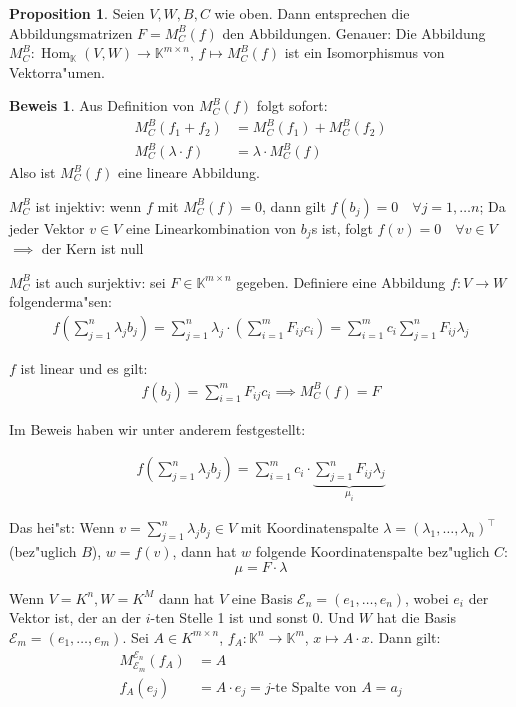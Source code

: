 \documentclass[oneside,fontsize=11pt,paper=a4,BCOR=0mm,DIV=12,automark,headsepline]{scrbook}
\DeclareMathOperator{\mHom}{Hom}
\theoremstyle{remark}
\theoremstyle{definition}
\newtheorem*{proposition}{Proposition}
\theoremstyle{definition}
\newtheorem*{prof}{Beweis}
\theoremstyle{remark}
\begin{document}
\begin{proposition} Seien \(V,W,B,C\) wie oben. Dann entsprechen die Abbildungsmatrizen
  \(F = M_C^B(f)\) den Abbildungen.  Genauer: Die Abbildung \(M_C^B: \mHom_\mathbb{K}(V,W)\to\mathbb{K}^{m\times n}\), \(f \mapsto M_C^B(f)\) ist ein Isomorphismus von
  Vektorra"umen.
\end{proposition}

\begin{prof}
  Aus Definition von \(M_C^B(f)\) folgt sofort:
  \begin{align*}
    M^B_C(f_1 + f_2) &= M_C^B(f_1) + M_C^B(f_2)\\
    M^B_C(\lambda\cdot f) &= \lambda\cdot M_C^B(f)
  \end{align*}
  Also ist \(M_C^B(f)\) eine lineare
  Abbildung.

  \(M_C^B\) ist injektiv: wenn \(f\) mit \(M^B_C(f) = 0\), dann gilt \(f(b_j) = 0\quad\forall j= 1,\dots n\); Da jeder Vektor \(v \in V\) eine Linearkombination von \(b_j\)s ist, folgt \(f(v) = 0 \quad\forall v \in V\) \(\implies\) der Kern ist null

  \(M^B_C\) ist auch surjektiv: sei \(F\in \mathbb{K}^{m\times n}\) gegeben. Definiere eine Abbildung \(f: V\to W\) folgenderma"sen:
  \begin{align*}
    f\left(\sum_{j=1}^n\lambda_jb_j\right) = \sum_{j=1}^n\lambda_j\cdot\left(\sum_{i=1}^mF_{ij}c_i\right)=\sum_{i=1}^mc_i\sum_{j=1}^nF_{ij}\lambda_j
  \end{align*}

  \(f\) ist linear und es gilt:
  \begin{align*}
    f(b_j) = \sum_{i=1}^mF_{ij}c_i \implies M^B_C(f) = F
  \end{align*}
\end{prof}

Im Beweis haben wir unter anderem festgestellt:
\begin{relation}
  \begin{align*}
    f\left(\sum_{j=1}^n\lambda_jb_j\right)=\sum_{i=1}^mc_i\cdot\underbrace{\sum_{j=1}^nF_{ij}\lambda_j}_{\mu_i}
  \end{align*}

  Das hei"st: Wenn \(v=\sum_{j=1}^n\lambda_jb_j\in V\) mit Koordinatenspalte \(\lambda = (\lambda_1,\dots,\lambda_n)^\top\) (bez"uglich \(B\)), \(w = f(v)\), dann hat \(w\) folgende Koordinatenspalte bez"uglich \(C\):
  \[
    \mu = F\cdot \lambda
  \]
\end{relation}

\begin{exa}
  Wenn \(V=K^n, W=K^M\) dann hat \(V\) eine Basis \(\mathcal{E}_n = (e_1, \dots, e_n)\), wobei \(e_i\) der Vektor ist, der an der \(i\)-ten Stelle 1 ist und sonst 0. Und \(W\) hat die Basis \(\mathcal{E}_m = (e_1, \dots, e_m)\).
  Sei \(A\in K^{m\times n }\), \(f_A: \mathbb{K}^n\to \mathbb{K}^m\), \(x \mapsto A\cdot x\). Dann gilt:
  \begin{align*}
    M^{\mathcal{E}_n}_{\mathcal{E}_m}(f_A) &= A\\
    f_A(e_j) &= A\cdot e_j = j\text{-te Spalte von } A = a_j
  \end{align*}
\end{exa}
\end{document}

